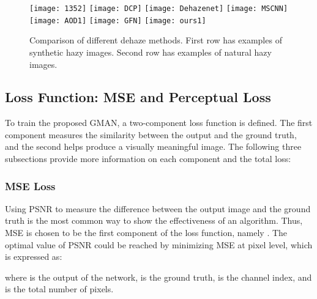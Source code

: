 \documentclass[journal]{IEEEtran}
\begin{document}
\begin{figure*}
	\texttt{[image: 1352]}
	\texttt{[image: DCP]}
	\texttt{[image: Dehazenet]}
	\texttt{[image: MSCNN]}
	\texttt{[image: AOD1]}
	\texttt{[image: GFN]}
	\texttt{[image: ours1]}
	\centering
\end{figure*}
\begin{figure*}
	\captionsetup{justification=centering}
	\centering
	\caption{Comparison of different dehaze methods. First row has examples of synthetic hazy images. Second row has examples of natural hazy images.}
	\label{figComp}
\end{figure*}

\subsection{Loss Function: MSE and Perceptual Loss}

To train the proposed GMAN, a two-component loss function is defined. The first component measures the similarity between the output and the ground truth, and the second helps produce a visually meaningful image. The following three subsections provide more information on each component and the total loss:

\subsubsection{MSE Loss}

Using PSNR to measure the difference between the output image and the ground truth is the most common way to show the effectiveness of an algorithm. Thus, MSE is chosen to be the first component of the loss function, namely . The optimal value of PSNR could be reached by minimizing MSE at pixel level, which is expressed as:

where  is the output of the network,  is the ground truth,  is the channel index, and  is the total number of pixels.
\end{document}
